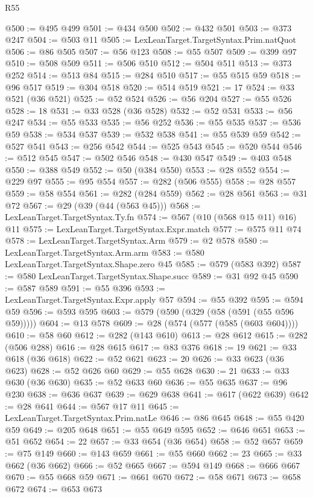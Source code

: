 \begin{lexlean}{R55}
\begin{coremodule}
@500 := @495 @499
@501 := @434 @500
@502 := @432 @501
@503 := @373 @247
@504 := @503 @11
@505 := LexLeanTarget.TargetSyntax.Prim.natQuot
@506 := @86 @505
@507 := @56 @123
@508 := @55 @507
@509 := @399 @97
@510 := @508 @509
@511 := @506 @510
@512 := @504 @511
@513 := @373 @252
@514 := @513 @84
@515 := @284 @510
@517 := @55 @515 @59
@518 := @96 @517
@519 := @304 @518
@520 := @514 @519
@521 := 17
@524 := @33 @521 (@36 @521)
@525 := @52 @524
@526 := @56 @204
@527 := @55 @526
@528 := 18
@531 := @33 @528 (@36 @528)
@532 := @52 @531
@533 := @56 @247
@534 := @55 @533
@535 := @56 @252
@536 := @55 @535
@537 := @536 @59
@538 := @534 @537
@539 := @532 @538
@541 := @55 @539 @59
@542 := @527 @541
@543 := @256 @542
@544 := @525 @543
@545 := @520 @544
@546 := @512 @545
@547 := @502 @546
@548 := @430 @547
@549 := @403 @548
@550 := @388 @549
@552 := @50 (@384 @550)
@553 := @28 @552
@554 := @229 @97
@555 := @95 @554
@557 := @282 (@506 @555)
@558 := @28 @557
@559 := @58 @554
@561 := @282 (@284 @559)
@562 := @28 @561
@563 := @31 @72
@567 := @29 (@39 (@44 (@563 @45)))
@568 := LexLeanTarget.TargetSyntax.Ty.fn
@574 := @567 (@10 (@568 @15 @11) @16) @11
@575 := LexLeanTarget.TargetSyntax.Expr.match
@577 := @575 @11 @74
@578 := LexLeanTarget.TargetSyntax.Arm
@579 := @2 @578
@580 := LexLeanTarget.TargetSyntax.Arm.arm
@583 := @580 LexLeanTarget.TargetSyntax.Shape.zero @45
@585 := @579 (@583 @392)
@587 := @580 LexLeanTarget.TargetSyntax.Shape.succ
@589 := @31 @92 @45
@590 := @587 @589
@591 := @55 @396
@593 := LexLeanTarget.TargetSyntax.Expr.apply @57
@594 := @55 @392
@595 := @594 @59
@596 := @593 @595
@603 := @579 (@590 (@329 (@58 (@591 (@55 @596 @59)))))
@604 := @13 @578
@609 := @28 (@574 (@577 (@585 (@603 @604))))
@610 := @58 @60
@612 := @282 (@143 @610)
@613 := @28 @612
@615 := @282 (@506 @288)
@616 := @28 @615
@617 := @83 @376
@618 := 19
@621 := @33 @618 (@36 @618)
@622 := @52 @621
@623 := 20
@626 := @33 @623 (@36 @623)
@628 := @52 @626 @60
@629 := @55 @628
@630 := 21
@633 := @33 @630 (@36 @630)
@635 := @52 @633 @60
@636 := @55 @635
@637 := @96 @230
@638 := @636 @637
@639 := @629 @638
@641 := @617 (@622 @639)
@642 := @28 @641
@644 := @567 @17 @11
@645 := LexLeanTarget.TargetSyntax.Prim.natLe
@646 := @86 @645
@648 := @55 @420 @59
@649 := @205 @648
@651 := @55 @649 @595
@652 := @646 @651
@653 := @51 @652
@654 := 22
@657 := @33 @654 (@36 @654)
@658 := @52 @657
@659 := @75 @149
@660 := @143 @659
@661 := @55 @660
@662 := 23
@665 := @33 @662 (@36 @662)
@666 := @52 @665
@667 := @594 @149
@668 := @666 @667
@670 := @55 @668 @59
@671 := @661 @670
@672 := @58 @671
@673 := @658 @672
@674 := @653 @673

\end{coremodule}
\end{lexlean}
